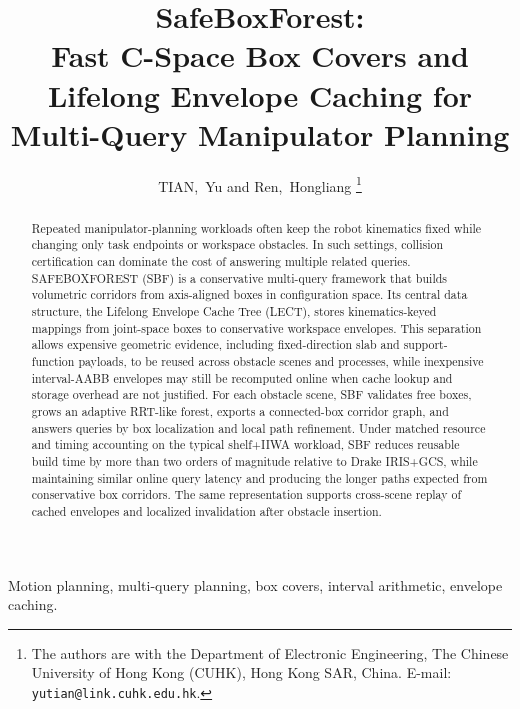 \documentclass[journal]{IEEEtran}
\DeclareRobustCommand{\textsc}[1]{\textnormal{\MakeUppercase{#1}}}
\begin{document}
\title{SafeBoxForest:\\ Fast C-Space Box Covers and Lifelong Envelope Caching
for Multi-Query Manipulator Planning}

\author{TIAN,~Yu and Ren,~Hongliang%
\thanks{The authors are with the Department of Electronic Engineering,
The Chinese University of Hong Kong (CUHK), Hong Kong SAR, China.
E-mail: \texttt{yutian@link.cuhk.edu.hk}.}}

\maketitle

\begin{abstract}
Repeated manipulator-planning workloads often keep the robot kinematics fixed
while changing only task endpoints or workspace obstacles. In such settings,
collision certification can dominate the cost of answering multiple related
queries. \textsc{SafeBoxForest} (SBF) is a conservative multi-query framework
that builds volumetric corridors from axis-aligned boxes in configuration
space. Its central data structure, the Lifelong Envelope Cache Tree (LECT),
stores kinematics-keyed mappings from joint-space boxes to conservative
workspace envelopes. This separation allows expensive geometric evidence,
including fixed-direction slab and support-function payloads, to be reused
across obstacle scenes and processes, while inexpensive interval-AABB envelopes
may still be recomputed online when cache lookup and storage overhead are not
justified. For each obstacle scene, SBF
validates free boxes, grows an adaptive RRT-like forest, exports a
connected-box corridor graph, and answers queries by box localization and
local path refinement. Under matched resource and timing accounting on the
typical shelf+IIWA workload, SBF reduces reusable build time by more than two orders
of magnitude relative to Drake IRIS+GCS, while maintaining similar online query
latency and producing the longer paths expected from conservative box
corridors. The same representation supports cross-scene replay of cached
envelopes and localized invalidation after obstacle insertion.
\end{abstract}

\begin{IEEEkeywords}
Motion planning, multi-query planning, box covers, interval arithmetic, envelope caching.
\end{IEEEkeywords}

\end{document}
